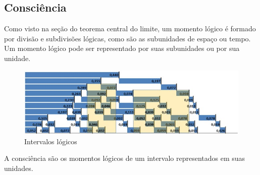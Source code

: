\subsection{Consciência}
Como visto na seção do teorema central do limite, um momento lógico é formado por divisão e subdivisões lógicas, como são as subunidades de espaço ou tempo. Um momento lógico pode ser representado por suas subunidades ou por sua unidade.

\begin{figure}[H]
\caption{Intervalos lógicos}
\label{fig:2_consciousnesses_in_all_unconscious}
\centering
\includegraphics[scale=1]{sections/images/2_consciousnesses_in_all_unconscious.jpg}
\end{figure}

A consciência são os momentos lógicos de um intervalo representados em suas unidades.

